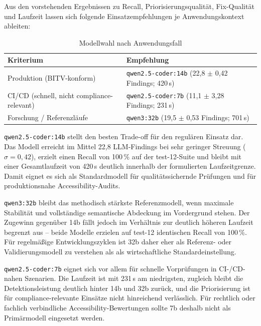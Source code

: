Aus den vorstehenden Ergebnissen zu Recall, Priorisierungsqualität, Fix-Qualität und Laufzeit lassen sich folgende Einsatzempfehlungen je Anwendungskontext ableiten:

\begin{table}[htbp]
\centering
\small
\renewcommand{\arraystretch}{1.15}
\begin{tabular}{@{}lp{8.6cm}@{}}
\toprule
\textbf{Kriterium} & \textbf{Empfehlung} \\
\midrule
Produktion (\ac{BITV}-konform) & \texttt{qwen2.5-coder:14b} (22,8 $\pm$ 0,42 Findings; 420\,s) \\
CI/CD (schnell, nicht compliance-relevant) & \texttt{qwen2.5-coder:7b} (11,1 $\pm$ 3,28 Findings; 231\,s) \\
Forschung / Referenzläufe & \texttt{qwen3:32b} (19,5 $\pm$ 0,53 Findings; 701\,s) \\
\bottomrule
\end{tabular}
\caption{Modellwahl nach Anwendungsfall}
\label{tab:modellwahl}
\end{table}

\texttt{qwen2.5-coder:14b} stellt den besten Trade-off für den regulären Einsatz dar. Das Modell erreicht im Mittel 22,8 \ac{LLM}-Findings bei sehr geringer Streuung ($\sigma = 0{,}42$), erzielt einen Recall von 100\,\% auf der test-12-Suite und bleibt mit einer Gesamtlaufzeit von 420\,s deutlich innerhalb der formulierten Laufzeitgrenze. Damit eignet es sich als Standardmodell für qualitätssichernde Prüfungen und für produktionsnahe Accessibility-Audits.

\texttt{qwen3:32b} bleibt das methodisch stärkste Referenzmodell, wenn maximale Stabilität und vollständige semantische Abdeckung im Vordergrund stehen. Der Zugewinn gegenüber 14b fällt jedoch im Verhältnis zur deutlich höheren Laufzeit begrenzt aus -- beide Modelle erzielen auf test-12 identischen Recall von 100\,\%. Für regelmäßige Entwicklungszyklen ist 32b daher eher als Referenz- oder Validierungsmodell zu verstehen als als wirtschaftliche Standardeinstellung.

\texttt{qwen2.5-coder:7b} eignet sich vor allem für schnelle Vorprüfungen in CI-/CD-nahen Szenarien. Die Laufzeit ist mit 231\,s am niedrigsten, zugleich bleibt die Detektionsleistung deutlich hinter 14b und 32b zurück, und die Priorisierung ist für compliance-relevante Einsätze nicht hinreichend verlässlich. Für rechtlich oder fachlich verbindliche Accessibility-Bewertungen sollte 7b deshalb nicht als Primärmodell eingesetzt werden.

